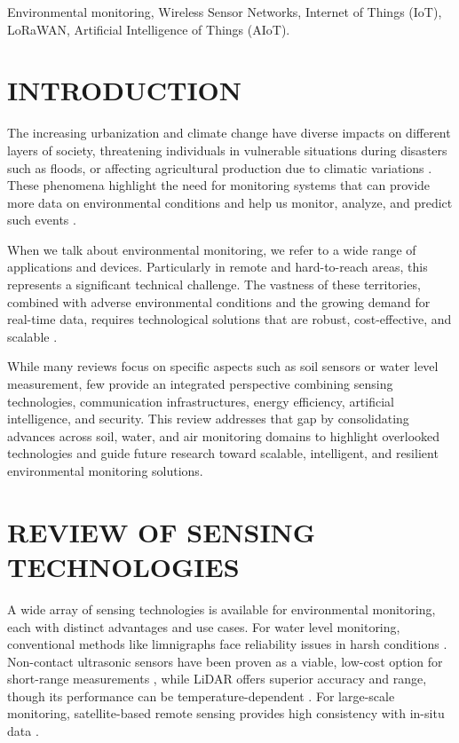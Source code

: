 \begin{IEEEkeywords}
Environmental monitoring, Wireless Sensor Networks, Internet of Things (IoT), LoRaWAN, Artificial Intelligence of Things (AIoT).
\end{IEEEkeywords}

\section{INTRODUCTION}
The increasing urbanization and climate change have diverse impacts on different layers of society, threatening individuals in vulnerable situations during disasters such as floods, or affecting agricultural production due to climatic variations \cite{jonkman_2005_global}. These phenomena highlight the need for monitoring systems that can provide more data on environmental conditions and help us monitor, analyze, and predict such events \cite{hall_2014_understanding}.

When we talk about environmental monitoring, we refer to a wide range of applications and devices. Particularly in remote and hard-to-reach areas, this represents a significant technical challenge. The vastness of these territories, combined with adverse environmental conditions and the growing demand for real-time data, requires technological solutions that are robust, cost-effective, and scalable \cite{chen_2013_natural, yellampalli_2021_wireless }.

While many reviews focus on specific aspects such as soil sensors or water level measurement, few provide an integrated perspective combining sensing technologies, communication infrastructures, energy efficiency, artificial intelligence, and security. This review addresses that gap by consolidating advances across soil, water, and air monitoring domains to highlight overlooked technologies and guide future research toward scalable, intelligent, and resilient environmental monitoring solutions.

\section{REVIEW OF SENSING TECHNOLOGIES}
A wide array of sensing technologies is available for environmental monitoring, each with distinct advantages and use cases. For water level monitoring, conventional methods like limnigraphs face reliability issues in harsh conditions \cite{santana_2024_development}. Non-contact ultrasonic sensors have been proven as a viable, low-cost option for short-range measurements \cite{mohammadrezamasoudimoghaddam_2024_a}, while LiDAR offers superior accuracy and range, though its performance can be temperature-dependent \cite{paul_2020_a}. For large-scale monitoring, satellite-based remote sensing provides high consistency with in-situ data \cite{jiang_2024_monitoring, ali_2024_satellite}.

